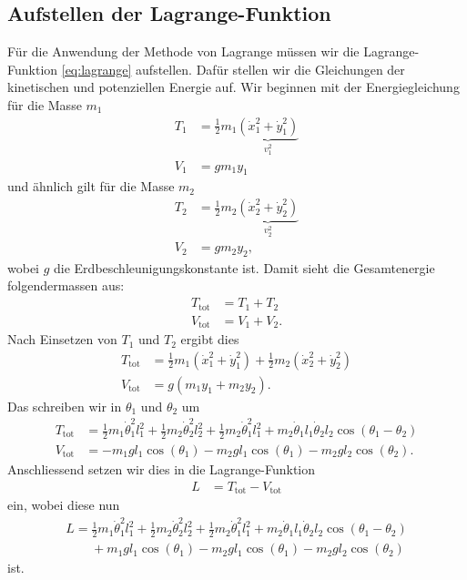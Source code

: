 \subsection{Aufstellen der Lagrange-Funktion}
Für die Anwendung der Methode von Lagrange müssen wir die Lagrange-Funktion 
\eqref{eq:lagrange} aufstellen.
Dafür stellen wir die Gleichungen der kinetischen und potenziellen Energie auf.
%
%
Wir beginnen mit der Energiegleichung für die Masse \(m_1\)
\begin{align*}
    T_1 &= \frac{1}{2} m_1 
    \underbrace{( \dot{x}_1^2 + \dot{y}_1^2 )}_{\displaystyle v_1^2}\\
    V_1 &= g m_1 y_1
\end{align*}
und ähnlich gilt für die Masse \(m_2\)
\begin{align*}
    T_2 &= \frac{1}{2} m_2 
    \underbrace{( \dot{x}_2^2 + \dot{y}_2^2 )}_{\displaystyle v_2^2}\\
    V_2 &= g m_2 y_2,
\end{align*}
wobei \(g\) die Erdbeschleunigungskonstante ist.
%
%
Damit sieht die Gesamtenergie folgendermassen aus:
\begin{align*}
    T_{\text{tot}} &= T_1 + T_2\\
    V_{\text{tot}} &= V_1 + V_2.
\end{align*}
Nach Einsetzen von \(T_1\) und \(T_2\) ergibt dies
\begin{align*}
    T_{\text{tot}} &= \frac{1}{2} m_1 ( \dot{x}_1^2 + \dot{y}_1^2 ) +
    \frac{1}{2} m_2 ( \dot{x}_2^2 + \dot{y}_2^2 )\\
    V_{\text{tot}} &= g ( m_1 y_1 + m_2 y_2 ).
\end{align*}
Das schreiben wir in \(\theta_1\) und \(\theta_2\) um
\begin{align*}
    T_{\text{tot}} &= \frac{1}{2} m_1 \dot{\theta}^2_1 l_1^2 + 
    \frac{1}{2} m_2 \dot{\theta}^2_2 l_2^2 + \frac{1}{2}
    m_2 \dot{\theta}^2_1 l_1^2 + 
    m_2 \dot{\theta}_1 l_1 \dot{\theta}_2 l_2 
    \cos(\theta_1 - \theta_2)\\
    V_{\text{tot}} &= -m_1 g l_1 \cos(\theta_1) -
    m_2 g l_1 \cos(\theta_1) -
    m_2 g l_2 \cos(\theta_2).
\end{align*}
Anschliessend setzen wir dies in die Lagrange-Funktion
\begin{align*}
    L &= T_{\text{tot}} - V_{\text{tot}}
\end{align*}
ein, wobei diese nun
\begin{align*}
    L = \frac{1}{2} m_1 \dot{\theta}^2_1 l_1^2 + 
    \frac{1}{2} m_2 \dot{\theta}^2_2 l_2^2 + \frac{1}{2}
    m_2 \dot{\theta}^2_1 l_1^2 + 
    m_2 \dot{\theta}_1 l_1 \dot{\theta}_2 l_2 
    \cos(\theta_1 - \theta_2)\\ \nonumber
    \qquad + m_1 g l_1 \cos(\theta_1) -
    m_2 g l_1 \cos(\theta_1) -
    m_2 g l_2 \cos(\theta_2)
\end{align*}
ist.

